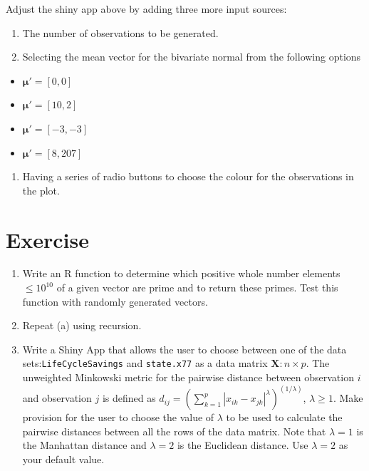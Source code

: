 \documentclass[
]{book}
\providecommand{\tightlist}{%
  \setlength{\itemsep}{0pt}\setlength{\parskip}{0pt}}
\begin{document}
Adjust the shiny app above by adding three more input sources:

\begin{enumerate}
\def\labelenumi{\roman{enumi}.}
\item
  The number of observations to be generated.
\item
  Selecting the mean vector for the bivariate normal from the following options
\end{enumerate}

\begin{itemize}
\tightlist
\item
  \(\mathbf{\mu}' = [0, 0]\)
\item
  \(\mathbf{\mu}' = [10, 2]\)
\item
  \(\mathbf{\mu}' = [-3, -3]\)
\item
  \(\mathbf{\mu}' = [8, 207]\)
\end{itemize}

\begin{enumerate}
\def\labelenumi{\roman{enumi}.}
\setcounter{enumi}{2}
\tightlist
\item
  Having a series of radio buttons to choose the colour for the observations in the plot.
\end{enumerate}

\section{Exercise}\label{exercise-12}

\begin{enumerate}
\def\labelenumi{(\alph{enumi})}
\item
  Write an R function to determine which positive whole number elements \(≤10^{10}\) of a given vector are prime and to return these primes. Test this function with randomly generated vectors.
\item
  Repeat (a) using recursion.
\item
  Write a Shiny App that allows the user to choose between one of the data sets:\texttt{LifeCycleSavings} and \texttt{state.x77} as a data matrix \(\mathbf{X}:n \times p\). The unweighted Minkowski metric for the pairwise distance between observation \(i\) and observation \(j\) is defined as \(d_{ij} = \left( \sum_{k=1}^p{|x_{ik}-x_{jk}|^λ} \right)^{(1/λ)}\), \(λ≥1\). Make provision for the user to choose the value of \(\lambda\) to be used to calculate the pairwise distances between all the rows of the data matrix. Note that \(λ=1\) is the Manhattan distance and \(λ=2\) is the Euclidean distance. Use \(λ=2\) as your default value.
\end{enumerate}
\end{document}
